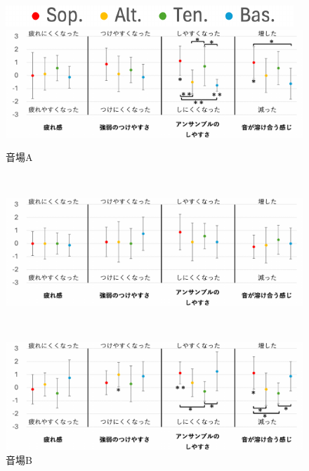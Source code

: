 \documentclass[11pt,a4j]{jreport}
\begin{document}
  \newpage
  \begin{figure}[H]
    \centering
    
    \begin{minipage}{1\linewidth}
      \centering
      \includegraphics[scale=.55]{images/subjectiveExp/statisticAnalysis/part_legend.pdf}
    \end{minipage}
    \vspace{.5\baselineskip}

    \begin{minipage}{1\linewidth}
      \centering
      \includegraphics[scale=.55]{images/subjectiveExp/statisticAnalysis/part_performance_a.pdf}
      \caption*{音場A}
      \label{fig:演奏の印象A}
    \end{minipage}
    \\
    \vspace{1\baselineskip}
    \begin{minipage}{1\linewidth}
      \centering
      \includegraphics[scale=.55]{images/subjectiveExp/statisticAnalysis/part_performance_b.pdf}
      \caption*{音場B}
      \label{fig:演奏の印象B}
    \end{minipage}
    \\
    \vspace{1\baselineskip}
    \begin{minipage}{1\linewidth}
      \centering
      \includegraphics[scale=.55]{images/subjectiveExp/statisticAnalysis/part_performance_c.pdf}

\end{minipage}
\end{figure}
\end{document}

